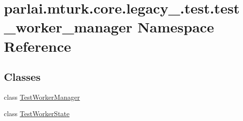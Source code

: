 \hypertarget{namespaceparlai_1_1mturk_1_1core_1_1legacy__2018_1_1test_1_1test__worker__manager}{}\section{parlai.\+mturk.\+core.\+legacy\+\_.\+test.\+test\+\_\+worker\+\_\+manager Namespace Reference}
\label{namespaceparlai_1_1mturk_1_1core_1_1legacy__2018_1_1test_1_1test__worker__manager}
\subsection*{Classes}
\begin{DoxyCompactItemize}
\item 
class \hyperlink{classparlai_1_1mturk_1_1core_1_1legacy__2018_1_1test_1_1test__worker__manager_1_1TestWorkerManager}{Test\+Worker\+Manager}
\item 
class \hyperlink{classparlai_1_1mturk_1_1core_1_1legacy__2018_1_1test_1_1test__worker__manager_1_1TestWorkerState}{Test\+Worker\+State}
\end{DoxyCompactItemize}
